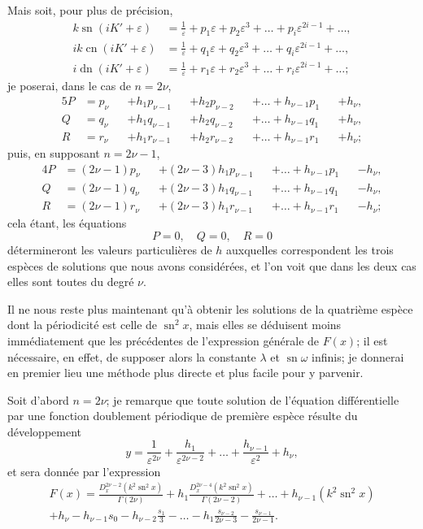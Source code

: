 \documentclass[11pt,leqno,oneside,letterpaper]{book}[2005/09/16]
\DeclareMathOperator{\sn}{sn}
\DeclareMathOperator{\cn}{cn}
\DeclareMathOperator{\dn}{dn}
\begin{document}
Mais soit, pour plus de pr\'ecision,
\begin{align*}
k\sn(iK' + \varepsilon)  &= \frac{1}{\varepsilon} + p_1 \varepsilon + p_2 \varepsilon^3 + \ldots + p_i \varepsilon^{2i-1} + \ldots,\\
ik\cn(iK' + \varepsilon) &= \frac{1}{\varepsilon} + q_1 \varepsilon + q_2 \varepsilon^3 + \ldots + q_i \varepsilon^{2i-1} + \ldots,\\
i\dn(iK' + \varepsilon)  &= \frac{1}{\varepsilon} + r_1 \varepsilon + r_2 \varepsilon^3 + \ldots + r_i \varepsilon^{2i-1} + \ldots;
\end{align*}
je poserai, dans le cas de $n = 2\nu$,
\begin{alignat*}{5}
P &= p_{\nu} &&+ h_1 p_{\nu-1} &&+ h_2 p_{\nu-2} &&+ \ldots + h_{\nu-1} p_1 &&+ h_{\nu},\\
Q &= q_{\nu} &&+ h_1 q_{\nu-1} &&+ h_2 q_{\nu-2} &&+ \ldots + h_{\nu-1} q_1 &&+ h_{\nu},\\
R &= r_{\nu} &&+ h_1 r_{\nu-1} &&+ h_2 r_{\nu-2} &&+ \ldots + h_{\nu-1} r_1 &&+ h_{\nu};
\end{alignat*}
puis, en supposant $n=2\nu - 1$,
\begin{alignat*}{4}
P &= (2\nu-1) p_{\nu} &&+ (2\nu-3) h_1 p_{\nu-1} &&+ \ldots + h_{\nu-1} p_1 &&- h_{\nu},\\
Q &= (2\nu-1) q_{\nu} &&+ (2\nu-3) h_1 q_{\nu-1} &&+ \ldots + h_{\nu-1} q_1 &&- h_{\nu},\\
R &= (2\nu-1) r_{\nu} &&+ (2\nu-3) h_1 r_{\nu-1} &&+ \ldots + h_{\nu-1} r_1 &&- h_{\nu};
\end{alignat*}
cela \'etant, les \'equations
\[
P=0, \quad Q=0, \quad R=0
\]
d\'etermineront les valeurs particuli\`eres de $h$ auxquelles correspondent les
trois esp\`eces de solutions que nous avons consid\'er\'ees, et l'on voit que dans
les deux cas elles sont toutes du degr\'e $\nu$.

Il ne nous reste plus maintenant qu'\`a obtenir les solutions de la quatri\`eme
esp\`ece dont la p\'eriodicit\'e est celle de $\sn^2x$, mais elles se d\'eduisent
moins imm\'ediatement que les pr\'ec\'edentes de l'expression g\'en\'erale de $F(x)$;
il est n\'ecessaire, en effet, de supposer alors la constante $\lambda$ et $\sn \omega$ infinis;
je donnerai en premier lieu une m\'ethode plus directe et plus facile pour
y parvenir.

Soit d'abord $n=2\nu$; je remarque que toute solution de l'\'equation
diff\'erentielle par une fonction doublement p\'eriodique de premi\`ere esp\`ece
r\'esulte du d\'eveloppement
\[
y = \frac{1}{\varepsilon^{2\nu}} + \frac{h_1}{\varepsilon^{2\nu-2}} + \ldots + \frac{h_{\nu-1}}{\varepsilon^2} + h_{\nu},
\]
et sera donn\'ee par l'expression
\begin{multline*}
F(x) =     \frac{D_x^{2\nu-2} (k^2\sn^2 x)}{\Gamma(2\nu)}
     + h_1 \frac{D_x^{2\nu-4} (k^2\sn^2 x)}{\Gamma(2\nu-2)} + \ldots
     + h_{\nu-1}              (k^2\sn^2 x) \\
     + h_{\nu} - h_{\nu-1} s_0 - h_{\nu-2} \frac{s_1}{3} - \ldots
     - h_1\frac{s_{\nu-2}}{2\nu-3} - \frac{s_{\nu-1}}{2\nu-1}.
\end{multline*}
\end{document}
